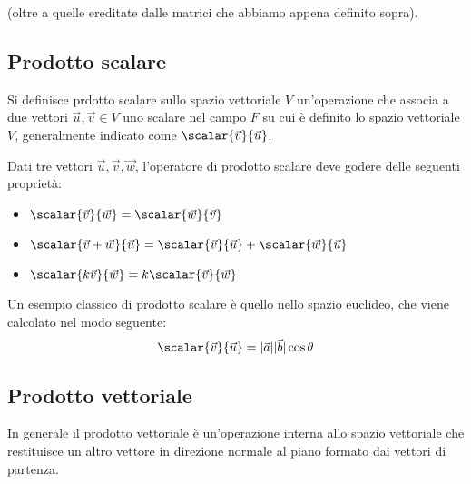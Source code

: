  (oltre a quelle ereditate dalle matrici che abbiamo appena definito sopra).
\subsection{Prodotto scalare}
Si definisce prdotto scalare sullo spazio vettoriale $V$ un'operazione che associa a due vettori $\vec{u}, \vec{v} \in V$ uno scalare nel campo $F$ su cui è definito lo spazio vettoriale $V$, generalmente indicato come $\scalar{\vec{v}}{\vec{u}}$.

Dati tre vettori $\vec{u}, \vec{v}, \vec{w}$, l'operatore di prodotto scalare deve godere delle seguenti proprietà:
\begin{itemize}
    \item $\scalar{\vec{v}}{\vec{w}} = \scalar{\vec{w}}{\vec{v}}$
    \item $\scalar{\vec{v} + \vec{w}}{\vec{u}} = \scalar{\vec{v}}{\vec{u}} + \scalar{\vec{w}}{\vec{u}}$
    \item $\scalar{k\vec{v}}{\vec{w}} = k\scalar{\vec{v}}{\vec{w}}$
\end{itemize}
Un esempio classico di prodotto scalare è quello nello spazio euclideo, che viene calcolato nel modo seguente:
\begin{equation*}
    \scalar{\vec{v}}{\vec{u}} = |\vec{a}| |\vec{b}| \cos{\theta}
\end{equation*}
\subsection{Prodotto vettoriale}
In generale il prodotto vettoriale è un'operazione interna allo spazio vettoriale che restituisce un altro vettore in direzione normale al piano formato dai vettori di partenza.

